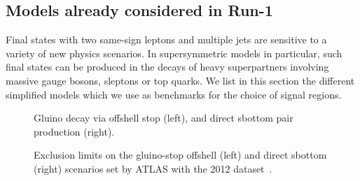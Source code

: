 \subsection{Models already considered in Run-1}
Final states with two same-sign leptons and multiple jets are sensitive to a variety of new physics scenarios. 
In supersymmetric models in particular, such final states can be produced in the decays of heavy superpartners 
involving massive gauge bosons, sleptons or top quarks. 
We list in this section the different simplified models which we use as benchmarks for the choice of signal regions. 


\begin{figure}[h!]
\centering
{}
\caption{Gluino decay via offshell stop (left), and direct sbottom pair production (right).}
\label{fig:feynman_3rdgen}
\end{figure}

\begin{figure}[t]
\centering
{}
\caption{Exclusion limits on the gluino-stop offshell (left) and direct sbottom (right) scenarios 
set by ATLAS with the 2012 dataset~\cite{DraftSquarkGluinoSummaryPaper}.}
\label{fig:run1excl_3rdgen}
\end{figure}

